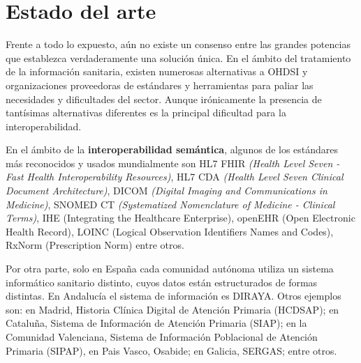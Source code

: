 \section{Estado del arte} \label{sec:01EstadoArte} 



Frente a todo lo expuesto, aún no existe un consenso entre las grandes potencias que establezca verdaderamente una solución única. En el ámbito del tratamiento de la información sanitaria, existen numerosas alternativas a OHDSI y organizaciones proveedoras de estándares y herramientas para paliar las necesidades y dificultades del sector. Aunque irónicamente la presencia de tantísimas alternativas diferentes es la principal dificultad para la interoperabilidad.

En el ámbito de la \textbf{interoperabilidad semántica}, algunos de los estándares más reconocidos y usados mundialmente son HL7 FHIR \textit{(Health Level Seven - Fast Health Interoperability Resources)}, HL7 CDA \textit{(Health Level Seven Clinical Document Architecture)}, DICOM \textit{(Digital Imaging and Communications in Medicine)}, SNOMED CT \textit{(Systematized Nomenclature of Medicine - Clinical Terms)}, IHE (Integrating the Healthcare Enterprise), openEHR (Open Electronic Health Record), LOINC (Logical Observation Identifiers Names and Codes), RxNorm (Prescription Norm) entre otros.

Por otra parte, solo en España cada comunidad autónoma utiliza un sistema informático sanitario distinto, cuyos datos están estructurados de formas distintas. En Andalucía el sistema de información es DIRAYA. Otros ejemplos son: en Madrid, Historia Clínica Digital de Atención Primaria (HCDSAP); en Cataluña, Sistema de Información de Atención Primaria (SIAP); en la Comunidad Valenciana, Sistema de Información Poblacional de Atención Primaria (SIPAP), en Pais Vasco, Osabide; en Galicia, SERGAS; entre otros.

